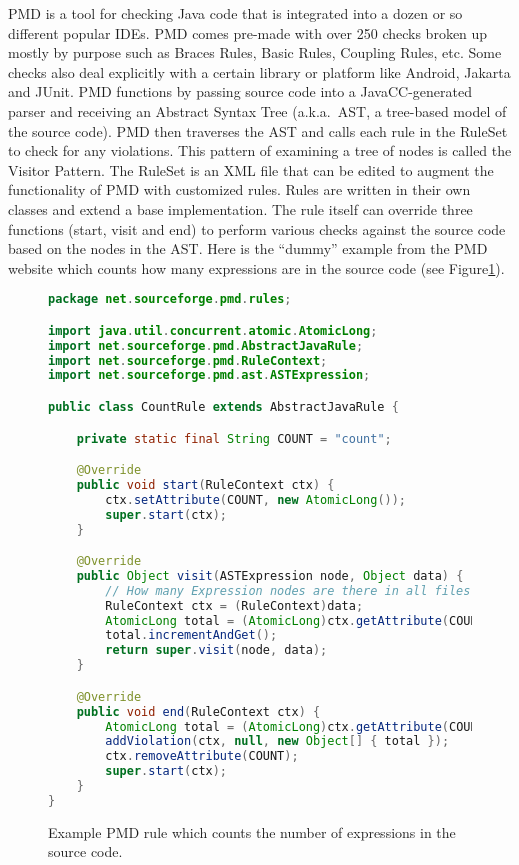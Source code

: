 \documentclass[12pt]{report}
\def\lstlistingname{Figure}
\newcommand{\refCode}{\lstlistingname \hspace{1mm}}
\begin{document}
PMD is a tool for checking Java code that is integrated into a dozen or so different popular IDEs.
PMD comes pre-made with over 250 checks broken up mostly by purpose such as Braces Rules, 
Basic Rules, Coupling Rules, etc. Some checks also deal explicitly with a certain 
library or platform like Android, Jakarta and JUnit. PMD functions by passing source code into a 
JavaCC-generated parser and receiving an Abstract Syntax Tree (a.k.a.\ AST, a tree-based model of 
the source code). PMD then traverses the AST and calls each rule in the RuleSet to check for any
violations. This pattern of examining a tree of nodes is called the Visitor Pattern\cite{design-patterns}. 
The RuleSet is an XML file that can be edited to augment the functionality of PMD with customized 
rules. Rules are written in their own classes and extend a base implementation. The rule itself can 
override three functions (start, visit and end) to perform various checks against the source code based 
on the nodes in the AST. Here is the ``dummy'' example from the PMD website which counts how 
many expressions are in the source code (see \refCode \ref{pmd-rule}).

\begin{figure}
\begin{lstlisting}[language=Java]
package net.sourceforge.pmd.rules;

import java.util.concurrent.atomic.AtomicLong;
import net.sourceforge.pmd.AbstractJavaRule;
import net.sourceforge.pmd.RuleContext;
import net.sourceforge.pmd.ast.ASTExpression;

public class CountRule extends AbstractJavaRule {

	private static final String COUNT = "count";

	@Override
	public void start(RuleContext ctx) {
		ctx.setAttribute(COUNT, new AtomicLong());
		super.start(ctx);
	}

	@Override
	public Object visit(ASTExpression node, Object data) {
		// How many Expression nodes are there in all files parsed! 
		RuleContext ctx = (RuleContext)data;
		AtomicLong total = (AtomicLong)ctx.getAttribute(COUNT);
		total.incrementAndGet();
		return super.visit(node, data);
	}

	@Override
	public void end(RuleContext ctx) {
		AtomicLong total = (AtomicLong)ctx.getAttribute(COUNT);
		addViolation(ctx, null, new Object[] { total });
		ctx.removeAttribute(COUNT);
		super.start(ctx);
	}
}
\end{lstlisting}
\caption[Example PMD Rule]{Example PMD rule which counts the number of expressions in the source code.}
\label{pmd-rule}
\end{figure}
\end{document}

